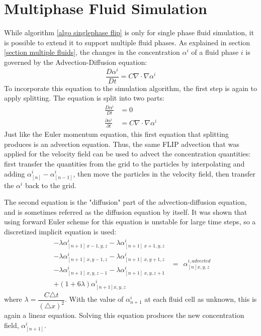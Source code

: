 \section{Multiphase Fluid Simulation}
While algorithm \ref{algo singlephase flip} is only for single phase fluid simulation, it is possible to extend it to support multiple fluid phases. As explained in section \ref{section multiple fluids}, the changes in the concentration $\alpha^i$ of a fluid phase $i$ is governed by the Advection-Diffusion equation:
$$
\frac{D \alpha^i}{D t} = C\nabla \cdot \nabla \alpha^i
$$
To incorporate this equation to the simulation algorithm, the first step is again to apply splitting. The equation is split into two parts:
\begin{equation*}
    \begin{aligned}
        \frac{D \alpha^i}{D t} &= 0\\
        \frac{\partial \alpha^i}{\partial t} &= C\nabla \cdot \nabla \alpha^i
    \end{aligned}
\end{equation*}
Just like the Euler momentum equation, this first equation that splitting produces is an advection equation. Thus, the same FLIP advection that was applied for the velocity field can be used to advect the concentration quantities: first transfer the quantities from the grid to the particles by interpolating and adding $\alpha^{i}_{[n]} - \alpha^{i}_{[n-1]}$, then move the particles in the velocity field, then transfer the $\alpha^i$ back to the grid. 

The second equation is the "diffusion" part of the advection-diffusion equation, and is sometimes referred as the diffusion equation by itself. It was shown that using forward Euler scheme for this equation is unstable for large time steps\cite{kang2010hybrid}, so a discretized implicit equation is used:
\begin{equation}
    \begin{aligned}
        - \lambda\alpha^i_{[n+1]~x-1,y,z}
        - \lambda\alpha^i_{[n+1]~x+1,y,z}\\
        - \lambda\alpha^i_{[n+1]~x,y-1,z}
        - \lambda\alpha^i_{[n+1]~x,y+1,z}\\
        - \lambda\alpha^i_{[n+1]~x,y,z-1}
        - \lambda\alpha^i_{[n+1]~x,y,z+1}\\
        +(1+6\lambda)\alpha^i_{[n+1] x,y,z} 
    \end{aligned}
    ~~=~~ \alpha^{i,advected}_{[n] x,y,z} 
    \label{eqn diffusion}
\end{equation}
where $\lambda = \dfrac{C\triangle t}{(\triangle x)^2}$. With the value of $\alpha^i_{n+1}$ at each fluid cell as unknown, this is again a linear equation. Solving this equation produces the new concentration field, $\alpha^i_{[n+1]}$.

